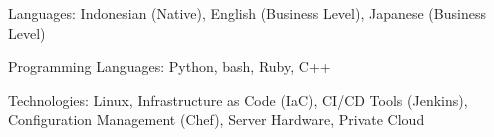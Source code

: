 

\begin{cvparagraph}

\begin{cvbullets}
    \item Languages: Indonesian (Native), English (Business Level), Japanese (Business Level)
    \item Programming Languages:  Python, bash, Ruby, C++
    \item Technologies: Linux, Infrastructure as Code (IaC), CI/CD Tools (Jenkins), Configuration Management (Chef), Server Hardware, Private Cloud
\end{cvbullets}
\end{cvparagraph}

